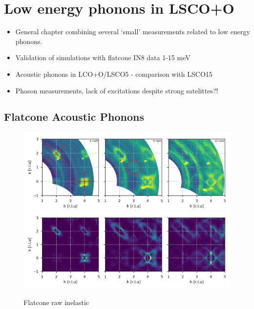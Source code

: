 \chapter{Low energy phonons in LSCO+O}\label{ch:lowen}

\begin{framed}
    \begin{itemize}
        \item General chapter combining several `small' measurements related to low energy phonons.
        \item Validation of simulations with flatcone IN8 data 1-15 meV
        \item Acoustic phonons in LCO+O/LSCO5 - comparison with LSCO15
        \item Phason measurements, lack of excitations despite strong satelittes?!
    \end{itemize}        
\end{framed}


\section{Flatcone Acoustic Phonons}

\begin{figure}
    \includegraphics[width=\textwidth]{fig/lowen/flatcone_colorplots.png}
    \includegraphics[width=\textwidth]{fig/lowen/simulation_colorplots.png}
    \caption[Flatcone raw inelastic]{Flatcone raw inelastic}
    \label{fig:flatcone_raw_inelastic}
\end{figure}

